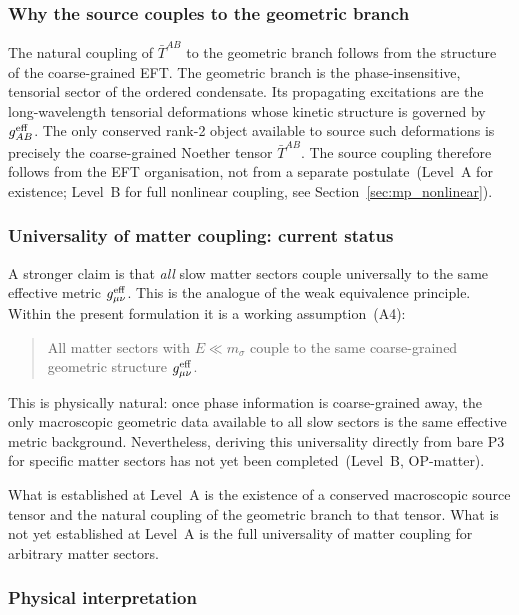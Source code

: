 \documentclass[11pt,a4paper]{article}
\numberwithin{equation}{section}
\begin{document}
\subsubsection*{Why the source couples to the geometric branch}

The natural coupling of $\bar{T}^{AB}$ to the geometric branch follows
from the structure of the coarse-grained EFT.
The geometric branch is the phase-insensitive, tensorial sector of the
ordered condensate.
Its propagating excitations are the long-wavelength tensorial
deformations whose kinetic structure is governed by $g^{\rm eff}_{AB}$.
The only conserved rank-2 object available to source such deformations
is precisely the coarse-grained Noether tensor $\bar{T}^{AB}$.
The source coupling therefore follows from the EFT organisation, not
from a separate postulate~(Level~A for existence; Level~B for full
nonlinear coupling, see Section~\ref{sec:mp_nonlinear}).

\subsubsection*{Universality of matter coupling: current status}

A stronger claim is that \emph{all} slow matter sectors couple
universally to the same effective metric $g^{\rm eff}_{\mu\nu}$.
This is the analogue of the weak equivalence principle.
Within the present formulation it is a working assumption~(A4):
\begin{quote}
All matter sectors with $E\ll m_\sigma$ couple to the same
coarse-grained geometric structure $g^{\rm eff}_{\mu\nu}$.
\end{quote}
This is physically natural: once phase information is coarse-grained
away, the only macroscopic geometric data available to all slow sectors
is the same effective metric background.
Nevertheless, deriving this universality directly from bare P3 for
specific matter sectors has not yet been completed~(Level~B, OP-matter).

What is established at Level~A is the existence of a conserved
macroscopic source tensor and the natural coupling of the geometric
branch to that tensor.
What is not yet established at Level~A is the full universality of
matter coupling for arbitrary matter sectors.

\subsubsection*{Physical interpretation}
\end{document}
